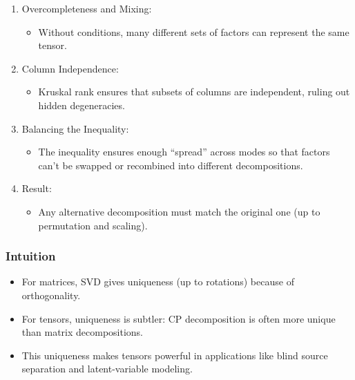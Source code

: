 \documentclass[
  letterpaper,
  DIV=11,
  numbers=noendperiod]{scrreprt}
\providecommand{\tightlist}{%
  \setlength{\itemsep}{0pt}\setlength{\parskip}{0pt}}
\begin{document}
\begin{enumerate}
\def\labelenumi{\arabic{enumi}.}
\item
  Overcompleteness and Mixing:

  \begin{itemize}
  \tightlist
  \item
    Without conditions, many different sets of factors can represent the
    same tensor.
  \end{itemize}
\item
  Column Independence:

  \begin{itemize}
  \tightlist
  \item
    Kruskal rank ensures that subsets of columns are independent, ruling
    out hidden degeneracies.
  \end{itemize}
\item
  Balancing the Inequality:

  \begin{itemize}
  \tightlist
  \item
    The inequality ensures enough ``spread'' across modes so that
    factors can't be swapped or recombined into different
    decompositions.
  \end{itemize}
\item
  Result:

  \begin{itemize}
  \tightlist
  \item
    Any alternative decomposition must match the original one (up to
    permutation and scaling).
  \end{itemize}
\end{enumerate}

\subsubsection{Intuition}\label{intuition}

\begin{itemize}
\tightlist
\item
  For matrices, SVD gives uniqueness (up to rotations) because of
  orthogonality.
\item
  For tensors, uniqueness is subtler: CP decomposition is often more
  unique than matrix decompositions.
\item
  This uniqueness makes tensors powerful in applications like blind
  source separation and latent-variable modeling.
\end{itemize}
\end{document}
